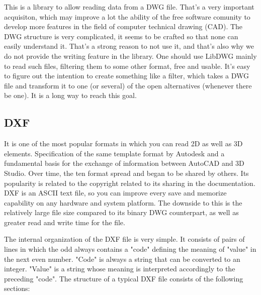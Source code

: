 \documentclass[a4paper, 11pt, article]{report}
\begin{document}
This is a library to allow reading data from a DWG file. That's a very important acquisiton, which may improve a lot the ability of the free software comunity to develop more features in the field of computer technical drawing (CAD).
The DWG structure is very complicated, it seems to be crafted so that none can easily understand it. That's a strong reason to not use it, and that's also why we do not provide the writing feature in the library. One should use LibDWG mainly to read such files, filtering them to some other format, free and usable.
It's easy to figure out the intention to create something like a filter, which takes a DWG file and transform it to one (or several) of the open alternatives (whenever there be one). It is a long way to reach this goal.
  
\subsection{DXF}
   
It is one of the most popular formats in which you can read 2D as well as 3D elements. Specification of the same template format by Autodesk and a fundamental basis for the exchange of information between AutoCAD and 3D Studio. Over time, the ten format spread and began to be shared by others. Its popularity is related to the copyright related to its sharing in the documentation. DXF is an ASCII text file, so you can improve every save and memorize capability on any hardware and system platform. The downside to this is the relatively large file size compared to its binary DWG counterpart, as well as greater read and write time for the file.
   
   
The internal organization of the DXF file is very simple. It consists of pairs of lines in which the odd always contains a "code" defining the meaning of "value" in the next even number. "Code" is always a string that can be converted to an integer. "Value" is a string whose meaning is interpreted accordingly to the preceding "code".
The structure of a typical DXF file consists of the following sections:
\end{document}
